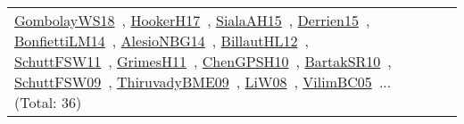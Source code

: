 {\begin{longtable}{lp{3cm}>{\raggedright\arraybackslash}p{6cm}>{\raggedright\arraybackslash}p{6cm}>{\raggedright\arraybackslash}p{8cm}}
\href{works/GombolayWS18.pdf}{GombolayWS18}~\cite{GombolayWS18}, \href{works/HookerH17.pdf}{HookerH17}~\cite{HookerH17}, \href{works/SialaAH15.pdf}{SialaAH15}~\cite{SialaAH15}, \href{works/Derrien15.pdf}{Derrien15}~\cite{Derrien15}, \href{works/BonfiettiLM14.pdf}{BonfiettiLM14}~\cite{BonfiettiLM14}, \href{works/AlesioNBG14.pdf}{AlesioNBG14}~\cite{AlesioNBG14}, \href{works/BillautHL12.pdf}{BillautHL12}~\cite{BillautHL12}, \href{works/SchuttFSW11.pdf}{SchuttFSW11}~\cite{SchuttFSW11}, \href{works/GrimesH11.pdf}{GrimesH11}~\cite{GrimesH11}, \href{works/ChenGPSH10.pdf}{ChenGPSH10}~\cite{ChenGPSH10}, \href{works/BartakSR10.pdf}{BartakSR10}~\cite{BartakSR10}, \href{works/SchuttFSW09.pdf}{SchuttFSW09}~\cite{SchuttFSW09}, \href{works/ThiruvadyBME09.pdf}{ThiruvadyBME09}~\cite{ThiruvadyBME09}, \href{works/LiW08.pdf}{LiW08}~\cite{LiW08}, \href{works/VilimBC05.pdf}{VilimBC05}~\cite{VilimBC05}... (Total: 36)\\

\end{longtable}}
